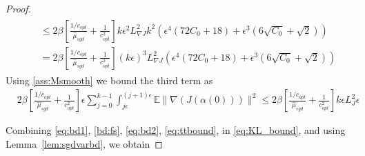 \documentclass[journal,onecolumn]{IEEEtran}
\newcommand{\step}{\epsilon}
\newcommand{\grad}{\nabla}
\newcommand{\gradn}{\hat{\nabla}}
\newcommand{\rew}{J}
\newcommand{\CE}{\mathbb{E}}
\newcommand{\alsbar}{\bar{\alpha}(s)}
\newcommand{\sbar}{\bar{s}}
\newcommand{\K}{K}
\newcommand{\Kd}{\K_{\Delta}}
\newcommand{\etsup}{M_{\theta}}
\newcommand{\gradnvar}{\zeta}
\newcommand{\lipJ}{L_J}
\newcommand{\lipGJ}{L_{\grad\rew}}
\newcommand{\sgdtm}{c_{opt}}
\begin{document}
{\begin{proof}
{\begin{align}
\begin{split}
&\quad \leq 2\beta \left[\frac{1/\sgdtm}{\hat{\mu}_{sgd}} + \frac{1}{\sgdtm^2} \right] k\step^2 \lipGJ^2 k^2 \left(\step^4\left(72C_0+ 18\right) + \step^3\left(6\sqrt{C_0} +\sqrt{2}\right)\right) \\
&\quad = 2\beta \left[\frac{1/\sgdtm}{\hat{\mu}_{sgd}} + \frac{1}{\sgdtm^2} \right] (k\step)^3 \lipGJ^2 \left(\step^4\left(72C_0+ 18\right) + \step^3\left(6\sqrt{C_0} +\sqrt{2}\right)\right)
\end{split}
\end{align}
Using \ref{ass:Msmooth} we bound the third term as
\begin{align}
\label{eq:ttbound}
 & 2\beta \left[\frac{1/\sgdtm}{\hat{\mu}_{sgd}} + \frac{1}{\sgdtm^2} \right]\step\sum_{j=0}^{k-1} \int_{j\step}^{(j+1)\step}\CE \|\grad(\rew(\alpha(0))) \|^2 \leq 2\beta \left[\frac{1/\sgdtm}{\hat{\mu}_{sgd}} + \frac{1}{\sgdtm^2} \right] k\step\lipJ^2\step
\end{align}

Combining \eqref{eq:bd1}, \eqref{bd:fs}, \eqref{eq:bd2}, \eqref{eq:ttbound}, in \eqref{eq:KL_bound}, and using Lemma~\ref{lem:sgdvarbd}, we obtain
 
}
\end{proof}}
\end{document}
